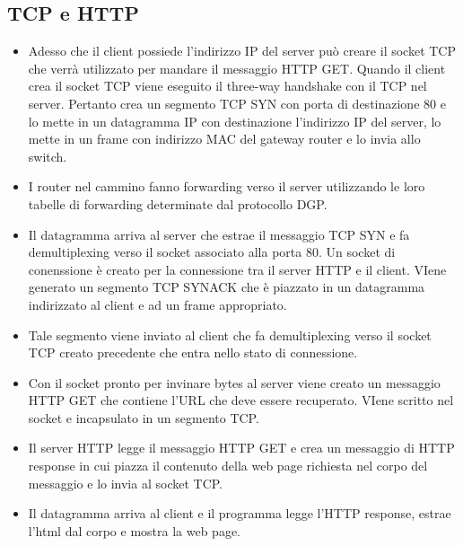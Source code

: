\subsection{TCP e HTTP}
\begin{itemize}
\item Adesso che il client possiede l'indirizzo IP del server pu\`o creare il socket TCP che verr\`a utilizzato per mandare il messaggio HTTP GET. Quando il client crea il socket TCP viene eseguito il three-way
handshake con il TCP nel server. Pertanto crea un segmento TCP SYN con porta di destinazione 80 e lo mette in un datagramma IP con destinazione l'indirizzo IP del server, lo mette in un frame con indirizzo 
MAC del gateway router e lo invia allo switch.
\item I router nel cammino fanno forwarding verso il server utilizzando le loro tabelle di forwarding determinate dal protocollo DGP.
\item Il datagramma arriva al server che estrae il messaggio TCP SYN e fa demultiplexing verso il socket associato alla porta 80. Un socket di conenssione \`e creato per la connessione tra il server HTTP e il 
client. VIene generato un segmento TCP SYNACK che \`e piazzato in un datagramma indirizzato al client e ad un frame appropriato.
\item Tale segmento viene inviato al client che fa demultiplexing verso il socket TCP creato precedente che entra nello stato di connessione.
\item Con il socket pronto per invinare bytes al server viene creato un messaggio HTTP GET che contiene l'URL che deve essere recuperato. VIene scritto nel socket e incapsulato in un segmento TCP.
\item Il server HTTP legge il messaggio HTTP GET e crea un messaggio di HTTP response in cui piazza il contenuto della web page richiesta nel corpo del messaggio e lo invia al socket TCP.
\item Il datagramma arriva al client e il programma legge l'HTTP response, estrae l'html dal corpo e mostra la web page. 
\end{itemize}